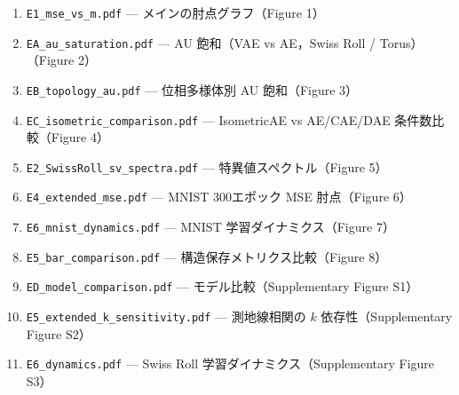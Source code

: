 \documentclass[12pt,a4paper]{ltjsarticle}  %
\begin{document}
\begin{enumerate}
  \item \texttt{E1\_mse\_vs\_m.pdf} --- メインの肘点グラフ（Figure 1）
  \item \texttt{EA\_au\_saturation.pdf} --- AU 飽和（VAE vs AE，Swiss Roll / Torus）（Figure 2）
  \item \texttt{EB\_topology\_au.pdf} --- 位相多様体別 AU 飽和（Figure 3）
  \item \texttt{EC\_isometric\_comparison.pdf} --- IsometricAE vs AE/CAE/DAE 条件数比較（Figure 4）
  \item \texttt{E2\_SwissRoll\_sv\_spectra.pdf} --- 特異値スペクトル（Figure 5）
  \item \texttt{E4\_extended\_mse.pdf} --- MNIST 300エポック MSE 肘点（Figure 6）
  \item \texttt{E6\_mnist\_dynamics.pdf} --- MNIST 学習ダイナミクス（Figure 7）
  \item \texttt{E5\_bar\_comparison.pdf} --- 構造保存メトリクス比較（Figure 8）
  \item \texttt{ED\_model\_comparison.pdf} --- モデル比較（Supplementary Figure S1）
  \item \texttt{E5\_extended\_k\_sensitivity.pdf} --- 測地線相関の $k$ 依存性（Supplementary Figure S2）
  \item \texttt{E6\_dynamics.pdf} --- Swiss Roll 学習ダイナミクス（Supplementary Figure S3）
\end{enumerate}
\end{document}
